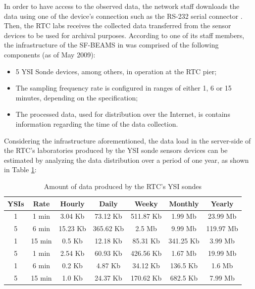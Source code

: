 In order to have access to the observed data, the network staff downloads the
data using one of the device's connection such as the RS-232 serial connector
\cite{rs232}. Then, the RTC labs receives the collected data transferred from
the sensor devices to be used for archival purposes. According to one of its
staff members, the infrastructure of the SF-BEAMS in was comprised of
the following components (as of May 2009):

\begin{itemize}
  \item 5 YSI Sonde devices, among others, in operation at the RTC pier;
  \item The sampling frequency rate is configured in ranges of either 1, 6 or
  15 minutes, depending on the specification;
  \item The processed data, used for distribution over the Internet, is
   contains information regarding the time of the data collection.
\end{itemize}

Considering the infrastructure aforementioned, the data load in the server-side
of the RTC's laboratories produced by the YSI sonde sensors devices can be
estimated by analyzing the data distribution over a period of one year, as
shown in Table \ref{tab:ysi-data-distribution}:

\begin{table}[!b]
    \label{tab:ysi-data-distribution}
    \caption{Amount of data produced by the RTC's YSI sondes}
        \begin{center}
        \begin{tabular}{|c|c|c|c|c|c|c|}\hline 
        \textbf{YSIs} & \textbf{Rate} & \textbf{Hourly} & \textbf{Daily} &
        \textbf{Weeky} & \textbf{Monthly} & \textbf{Yearly}\\\hline 
        1 & 1 min & 3.04 Kb & 73.12 Kb & 511.87 Kb & 1.99 Mb & 23.99 Mb\\\hline 
        5 & 6 min & 15.23 Kb & 365.62 Kb & 2.5 Mb & 9.99 Mb & 119.97 Mb\\\hline 
        1 & 15 min & 0.5 Kb & 12.18 Kb & 85.31 Kb & 341.25 Kb & 3.99 Mb\\\hline 
        5 & 1 min & 2.54 Kb & 60.93 Kb & 426.56 Kb & 1.67 Mb & 19.99 Mb\\\hline
        1 & 6 min & 0.2 Kb & 4.87 Kb & 34.12 Kb & 136.5 Kb & 1.6 Mb\\\hline 
        5 & 15 min & 1.0 Kb & 24.37 Kb & 170.62 Kb & 682.5 Kb & 7.99 Mb\\\hline
        \end{tabular}
        \end{center}
\end{table}

